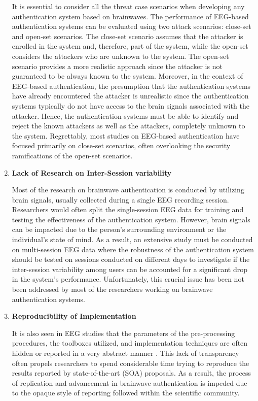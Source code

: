 \begin{enumerate}
It is essential to consider all the threat case scenarios when developing any authentication system based on brainwaves. The performance of EEG-based authentication systems can be evaluated using two attack scenarios: close-set and open-set scenarios. The close-set scenario assumes that the attacker is enrolled in the system and, therefore, part of the system, while the open-set considers the attackers who are unknown to the system. The open-set scenario provides a more realistic approach since the attacker is not guaranteed to be always known to the system. Moreover, in the context of EEG-based authentication, the presumption that the authentication systems have already encountered the attacker is unrealistic since the authentication systems typically do not have access to the brain signals associated with the attacker\cite{arias2023performance}. Hence, the authentication systems must be able to identify and reject the known attackers as well as the attackers, completely unknown to the system. %
Regrettably, most studies on EEG-based authentication have focused primarily on close-set scenarios, often overlooking the security ramifications of the open-set scenarios.

\item \textbf{\large Lack of Research on Inter-Session variability} 
\smallskip

Most of the research on brainwave authentication is conducted by utilizing brain signals, usually collected during a single EEG recording session. Researchers would often split the single-session EEG data for training and testing the effectiveness of the authentication system. However, brain signals can be impacted due to the person’s surrounding environment or the individual’s state of mind. As a result, an extensive study must be conducted on multi-session EEG data where the robustness of the authentication system should be tested on sessions conducted on different days to investigate if the inter-session variability among users can be accounted for a significant drop in the system’s performance. Unfortunately, this crucial issue has been not been addressed by most of the researchers working on brainwave authentication systems.

\item \textbf{\large Reproducibility of Implementation} 
\smallskip

It is also seen in EEG studies that the parameters of the pre-processing procedures, the toolboxes utilized, and implementation techniques are often hidden or reported in a very abstract manner \cite{moabb}. This lack of transparency often propels researchers to spend considerable time trying to reproduce the results reported by state-of-the-art (SOA) proposals. As a result, the process of replication and advancement in brainwave authentication is impeded due to the opaque style of reporting followed within the scientific community. 


\end{enumerate}
